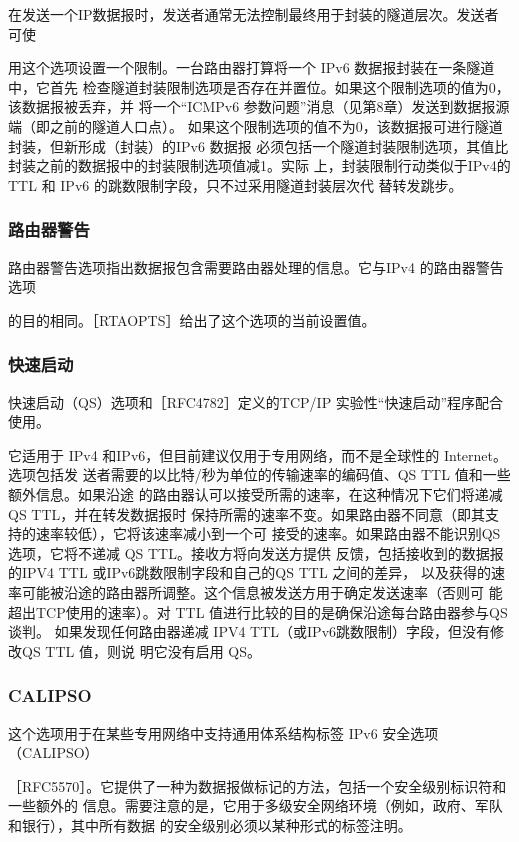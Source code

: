 在发送一个IP数据报时，发送者通常无法控制最终用于封装的隧道层次。发送者可使

用这个选项设置一个限制。一台路由器打算将一个 IPv6 数据报封装在一条隧道中，它首先
检查隧道封装限制选项是否存在并置位。如果这个限制选项的值为0，该数据报被丢弃，并
将一个“ICMPv6 参数问题”消息（见第8章）发送到数据报源端（即之前的隧道人口点）。
如果这个限制选项的值不为0，该数据报可进行隧道封装，但新形成（封装）的IPv6 数据报
必须包括一个隧道封装限制选项，其值比封装之前的数据报中的封装限制选项值减1。实际
上，封装限制行动类似于IPv4的TTL 和 IPv6 的跳数限制字段，只不过采用隧道封装层次代
替转发跳步。

\subsubsection{路由器警告}
路由器警告选项指出数据报包含需要路由器处理的信息。它与IPv4 的路由器警告选项

的目的相同。［RTAOPTS］给出了这个选项的当前设置值。

\subsubsection{快速启动}
快速启动（QS）选项和［RFC4782］定义的TCP/IP 实验性“快速启动”程序配合使用。

它适用于 IPv4 和IPv6，但目前建议仅用于专用网络，而不是全球性的 Internet。选项包括发
送者需要的以比特/秒为单位的传输速率的编码值、QS TTL 值和一些额外信息。如果沿途
的路由器认可以接受所需的速率，在这种情况下它们将递减QS TTL，并在转发数据报时
保持所需的速率不变。如果路由器不同意（即其支持的速率较低），它将该速率减小到一个可
接受的速率。如果路由器不能识别QS选项，它将不递减 QS TTL。接收方将向发送方提供
反馈，包括接收到的数据报的IPV4 TTL 或IPv6跳数限制字段和自己的QS TTL 之间的差异，
以及获得的速率可能被沿途的路由器所调整。这个信息被发送方用于确定发送速率（否则可
能超出TCP使用的速率）。对 TTL 值进行比较的目的是确保沿途每台路由器参与QS谈判。
如果发现任何路由器递减 IPV4 TTL（或IPv6跳数限制）字段，但没有修改QS TTL 值，则说
明它没有启用 QS。

\subsubsection{CALIPSO}
这个选项用于在某些专用网络中支持通用体系结构标签 IPv6 安全选项（CALIPSO）

［RFC5570］。它提供了一种为数据报做标记的方法，包括一个安全级别标识符和一些额外的
信息。需要注意的是，它用于多级安全网络环境（例如，政府、军队和银行），其中所有数据
的安全级别必须以某种形式的标签注明。


